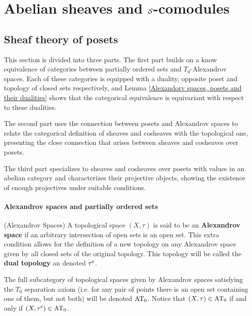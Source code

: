 \documentclass[thesis.tex]{subfiles}
\begin{document}
\section{Abelian sheaves and $\S$-comodules}

\subsection{Sheaf theory of posets}

This section is divided into three parts. The first part builds on a know equivalence of categories between partially ordered sets and $T_0$-Alexandrov spaces. Each of these categories is equipped with a duality, opposite poset and topology of closed sets respectively, and Lemma \ref{Alexandorv spaces, posets and their dualities} shows that the categorical equivalence is equivariant with respect to these dualities.

The second part uses the connection between posets and Alexandrov spaces to relate the categorical definition of sheaves and cosheaves with the topological one, presenting the close connection that arises between sheaves and cosheaves over posets.

The third part specializes to sheaves and cosheaves over posets with values in an abelian category and characterizes their projective objects, showing the existence of enough projectives under suitable conditions.

\paragraph{Alexandrov spaces and partially ordered sets}
\begin{definition}(Alexandrov Spaces) A topological space $(X,\tau)$ is said to be an \textbf{Alexandrov space} if an arbitrary intersection of open sets is an open set. This extra condition allows for the definition of a new topology on any Alexandrov space given by all closed sets of the original topology. This topology will be called the \textbf{dual topology} an denoted $\tau^\c$.

The full subcategory of topological spaces given by Alexandrov spaces satisfying the $T_0$ separation axiom (i.e.\! for any pair of points there is an open set containing one of them, but not both) will be denoted $\AT_0$. Notice that $(X,\tau)\in\AT_0$ if and only if $(X,\tau^{\c})\in\AT_0$.
\end{definition}
\end{document}
